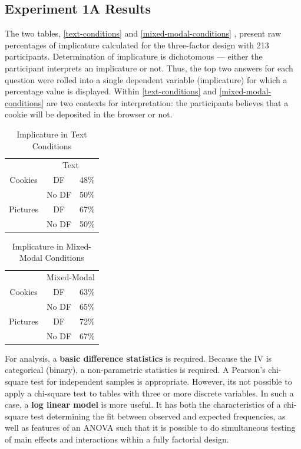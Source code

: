 \subsection{Experiment 1A Results}
\label{experiment1aresults}

The two tables,  \autoref{text-conditions} and \autoref{mixed-modal-conditions}  , present raw percentages of implicature calculated for the three-factor design with 213 participants. Determination of implicature is dichotomous --- either the participant interprets an implicature or not. Thus, the top two answers for each question were rolled into a single dependent variable (implicature) for which a percentage value is displayed. Within  \autoref{text-conditions}  and  \autoref{mixed-modal-conditions}  are two contexts for interpretation: the participants believes that a cookie will be deposited in the browser or not.


\begin{table}
\caption{Implicature in Text Conditions}
\label{text-conditions}
\centering
\begin{tabular}{ccc}
 & \multicolumn{2}{c}{Text}\tabularnewline
\cline{2-3} 
Cookies & DF & 48\%\tabularnewline
 & No DF & 50\%\tabularnewline
\hline 
Pictures & DF & 67\%\tabularnewline
 & No DF & 50\%\tabularnewline
\end{tabular}
\end{table}



\begin{table}
\caption{Implicature in Mixed-Modal Conditions}
\label{mixed-modal-conditions}
\centering
\begin{tabular}{ccc}
 & \multicolumn{2}{c}{Mixed-Modal}\tabularnewline
\cline{2-3} 
Cookies & DF & 63\%\tabularnewline
 & No DF & 65\%\tabularnewline
\hline 
Pictures & DF & 72\%\tabularnewline
 & No DF & 67\%\tabularnewline
\end{tabular}
\end{table}


For analysis, a \textbf{basic difference statistics} is required. Because the IV is categorical (binary), a non-parametric statistics is required. A Pearson's chi-square test for independent samples is appropriate. However, its not possible to apply a chi-square test to tables with three or more discrete variables. In such a case, a \textbf{log linear model} is more useful. It has both the characteristics of a chi-square test determining the fit between observed and expected frequencies, as well as features of an ANOVA such that it is possible to do simultaneous testing of main effects and interactions within a fully factorial design.

